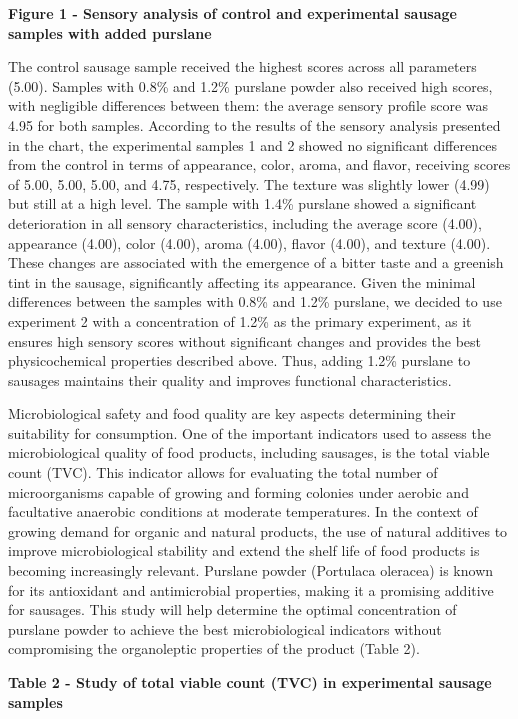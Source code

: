 {\bfseries Figure 1 - Sensory analysis of control and experimental sausage
samples with added purslane}

The control sausage sample received the highest scores across all
parameters (5.00). Samples with 0.8\% and 1.2\% purslane powder also
received high scores, with negligible differences between them: the
average sensory profile score was 4.95 for both samples. According to
the results of the sensory analysis presented in the chart, the
experimental samples 1 and 2 showed no significant differences from the
control in terms of appearance, color, aroma, and flavor, receiving
scores of 5.00, 5.00, 5.00, and 4.75, respectively. The texture was
slightly lower (4.99) but still at a high level. The sample with 1.4\%
purslane showed a significant deterioration in all sensory
characteristics, including the average score (4.00), appearance (4.00),
color (4.00), aroma (4.00), flavor (4.00), and texture (4.00). These
changes are associated with the emergence of a bitter taste and a
greenish tint in the sausage, significantly affecting its appearance.
Given the minimal differences between the samples with 0.8\% and 1.2\%
purslane, we decided to use experiment 2 with a concentration of 1.2\%
as the primary experiment, as it ensures high sensory scores without
significant changes and provides the best physicochemical properties
described above. Thus, adding 1.2\% purslane to sausages maintains their
quality and improves functional characteristics.

Microbiological safety and food quality are key aspects determining
their suitability for consumption. One of the important indicators used
to assess the microbiological quality of food products, including
sausages, is the total viable count (TVC). This indicator allows for
evaluating the total number of microorganisms capable of growing and
forming colonies under aerobic and facultative anaerobic conditions at
moderate temperatures. In the context of growing demand for organic and
natural products, the use of natural additives to improve
microbiological stability and extend the shelf life of food products is
becoming increasingly relevant. Purslane powder (Portulaca oleracea) is
known for its antioxidant and antimicrobial properties, making it a
promising additive for sausages. This study will help determine the
optimal concentration of purslane powder to achieve the best
microbiological indicators without compromising the organoleptic
properties of the product (Table 2).

{\bfseries Table 2 - Study of total viable count (TVC) in experimental
sausage samples}

